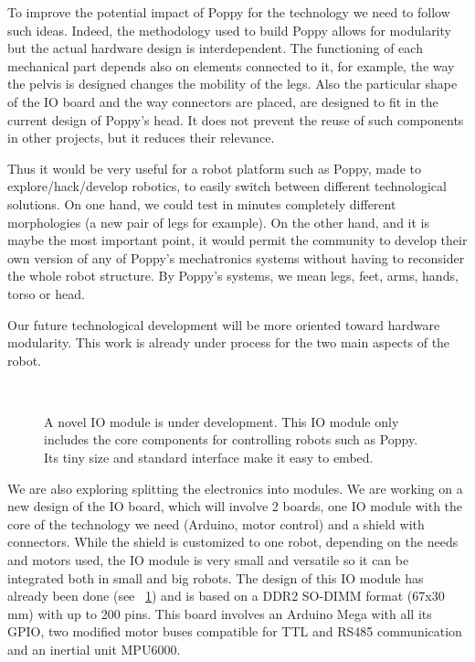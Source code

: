 To improve the potential impact of Poppy for the technology we need to follow such ideas. Indeed, the methodology used to build Poppy allows for modularity but the actual hardware design is interdependent. The functioning of each mechanical part depends also on elements connected to it, for example, the way the pelvis is designed changes the mobility of the legs. Also the particular shape of the IO board and the way connectors are placed, are designed to fit in the current design of Poppy's head. It does not prevent the reuse of such components in other projects, but it reduces their relevance.

Thus it would be very useful for a robot platform such as Poppy, made to explore/hack/develop robotics, to easily switch between different technological solutions. On one hand, we could test in minutes completely different morphologies (a new pair of legs for example). On the other hand, and it is maybe the most important point, it would permit the community to develop their own version of any of Poppy's mechatronics systems without having to reconsider the whole robot structure. By Poppy's systems, we mean legs, feet, arms, hands, torso or head.


Our future technological development will be more oriented toward hardware modularity. This work is already under process for the two main aspects of the robot.

\begin{figure}[tb]
\centering
    \hfil
     \\
    \caption{A novel IO module is under development. This IO module only includes the core components for controlling robots such as Poppy. Its tiny size and standard interface make it easy to embed.}
    \label{fig:poppy-electronic-modularity}
\end{figure}

We are also exploring splitting the electronics into modules. We are working on a new design of the IO board, which will involve 2 boards, one IO module with the core of the technology we need (Arduino, motor control) and a shield with connectors.
While the shield is customized to one robot, depending on the needs and motors used, the IO module is very small and versatile so it can be integrated both in small and big robots.
The design of this IO module has already been done (see \figurename~\ref{fig:poppy-electronic-modularity}) and is based on a DDR2 SO-DIMM format (67x30 mm) with up to 200 pins. This board involves an Arduino Mega with all its GPIO, two modified motor buses compatible for TTL and RS485 communication and an inertial unit MPU6000.


